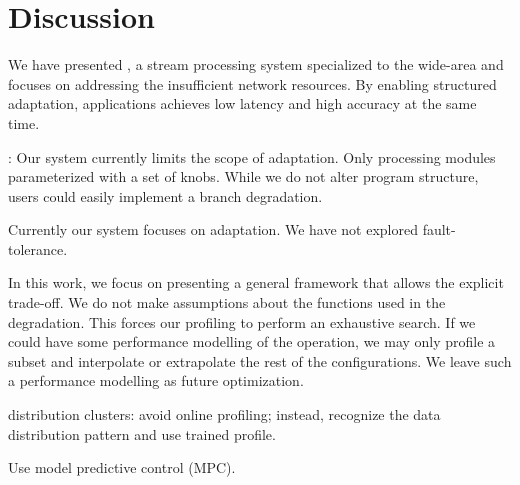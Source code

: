 \section{Discussion}
\label{sec:discussion}

We have presented \sysname{}, a stream processing system specialized to the
wide-area and focuses on addressing the insufficient network resources. By
enabling structured adaptation, applications achieves low latency and high
accuracy at the same time.

: Our system currently limits the scope of adaptation. Only
processing modules parameterized with a set of knobs. While we do not alter
program structure, users could easily implement a branch degradation.

 Currently our system focuses on adaptation. We have not
explored fault-tolerance.

 In this work, we focus on presenting a general
framework that allows the explicit trade-off. We do not make assumptions about
the functions used in the degradation. This forces our profiling to perform an
exhaustive search. If we could have some performance modelling of the operation,
we may only profile a subset and interpolate or extrapolate the rest of the
configurations. We leave such a performance modelling as future optimization.

 distribution clusters: avoid online profiling;
instead, recognize the data distribution pattern and use trained profile.

 Use model predictive control (MPC).

